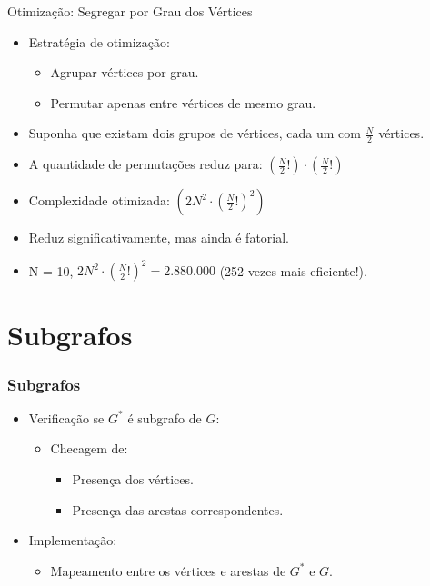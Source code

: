 \documentclass{beamer}
\begin{document}
\begin{frame}{Otimização: Segregar por Grau dos Vértices}

\begin{itemize}
    \item Estratégia de otimização:
    \begin{itemize}
        \item Agrupar vértices por grau.
        \item Permutar apenas entre vértices de mesmo grau.
    \end{itemize}

    \item Suponha que existam dois grupos de vértices, cada um com $\frac{N}{2}$ vértices.
    \item A quantidade de permutações reduz para: $\left(\frac{N}{2}!\right) \cdot \left(\frac{N}{2}!\right)$
    \item Complexidade otimizada: $\left(2N^2 \cdot \left(\frac{N}{2}!\right)^2\right)$
    \item Reduz significativamente, mas ainda é fatorial.
    \item N = 10, $2N^2 \cdot (\frac{N}{2}!)^2 = 2.880.000$ (252 vezes mais eficiente!).
\end{itemize}

\end{frame}

\section{Subgrafos}

\begin{frame}
\frametitle{Subgrafos}
\begin{itemize}
  \item Verificação se $G^*$ é subgrafo de $G$:
  \begin{itemize}
    \item Checagem de:
    \begin{itemize}
      \item Presença dos vértices.
      \item Presença das arestas correspondentes.
    \end{itemize}
  \end{itemize}
  \item Implementação:
  \begin{itemize}
    \item Mapeamento entre os vértices e arestas de $G^*$ e $G$.
  \end{itemize}
\end{itemize}
\end{frame}
\end{document}
